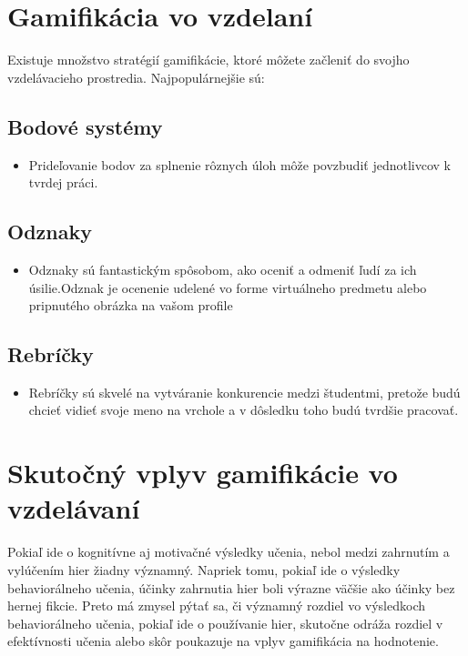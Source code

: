 \documentclass[10pt,twoside,slovak,a4paper]{article}
\begin{document}
\section{Gamifikácia vo vzdelaní} 

Existuje množstvo stratégií gamifikácie, ktoré môžete začleniť do svojho vzdelávacieho prostredia.
Najpopulárnejšie sú: 
\subsection{Bodové systémy}
    \begin{itemize}
    \item Prideľovanie bodov za splnenie rôznych úloh môže povzbudiť    jednotlivcov k tvrdej práci.
    \end{itemize}

\subsection{Odznaky}
    
    \begin{itemize}
    \item  Odznaky sú fantastickým spôsobom, ako oceniť a odmeniť ľudí za ich úsilie.Odznak je ocenenie udelené vo forme virtuálneho predmetu alebo pripnutého obrázka na vašom profile
    \end{itemize}
 
\subsection{Rebríčky} 

    \begin{itemize}
    \item Rebríčky sú skvelé na vytváranie konkurencie medzi študentmi, pretože budú chcieť vidieť svoje meno na vrchole a v dôsledku toho budú tvrdšie pracovať.
    \end{itemize}




\section{Skutočný vplyv gamifikácie vo vzdelávaní} 
Pokiaľ ide o kognitívne aj motivačné výsledky učenia, nebol medzi zahrnutím a vylúčením hier žiadny významný. Napriek tomu, pokiaľ ide o výsledky behaviorálneho učenia, účinky zahrnutia hier boli výrazne väčšie ako účinky bez hernej fikcie. Preto má zmysel pýtať sa, či významný rozdiel vo výsledkoch behaviorálneho učenia, pokiaľ ide o používanie hier, skutočne odráža rozdiel v efektívnosti učenia alebo skôr poukazuje na vplyv gamifikácia na hodnotenie.
\end{document}
